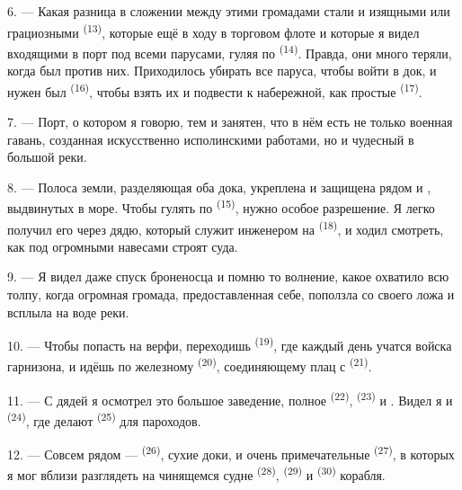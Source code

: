 6. --- Какая разница в сложении между этими громадами стали и изящными
 или грациозными 
\textsuperscript{(13)}, которые ещё в ходу в торговом флоте и которые я видел
входящими в порт под всеми парусами, гуляя по 
\textsuperscript{(14)}. Правда, они много теряли, когда  был против
них. Приходилось убирать все паруса, чтобы войти в док, и нужен был
 \textsuperscript{(16)}, чтобы взять их и подвести к набережной,
как простые  \textsuperscript{(17)}.

\VUsaut{3.0mm}
\VUsaut{3.0mm}

7. --- Порт, о котором я говорю, тем и занятен, что в нём есть не только
военная гавань, созданная искусственно исполинскими работами, но и
чудесный  в  большой реки.

8. --- Полоса земли, разделяющая оба дока, укреплена и защищена рядом
 и , выдвинутых в море. Чтобы гулять по
 \textsuperscript{(15)}, нужно особое разрешение. Я легко получил
его через дядю, который служит инженером на 
\textsuperscript{(18)}, и ходил смотреть, как под огромными навесами строят суда.

9. --- Я видел даже спуск броненосца и помню то волнение, какое охватило
всю толпу, когда огромная громада, предоставленная себе, поползла со
своего ложа и всплыла на воде реки.

10. --- Чтобы попасть на верфи, переходишь  \textsuperscript{(19)},
где каждый день учатся войска гарнизона, и идёшь по железному
 \textsuperscript{(20)}, соединяющему плац с 
\textsuperscript{(21)}.

\VUsaut{3.0mm}
\VUsaut{3.0mm}

11. --- С дядей я осмотрел это большое заведение, полное 
\textsuperscript{(22)},  \textsuperscript{(23)} и . Видел
я и  \textsuperscript{(24)}, где делают 
\textsuperscript{(25)} для пароходов.

12. --- Совсем рядом ---  \textsuperscript{(26)}, сухие доки, и очень
примечательные  \textsuperscript{(27)}, в которых я мог
вблизи разглядеть на чинящемся судне  \textsuperscript{(28)},
 \textsuperscript{(29)} и  \textsuperscript{(30)} корабля.

